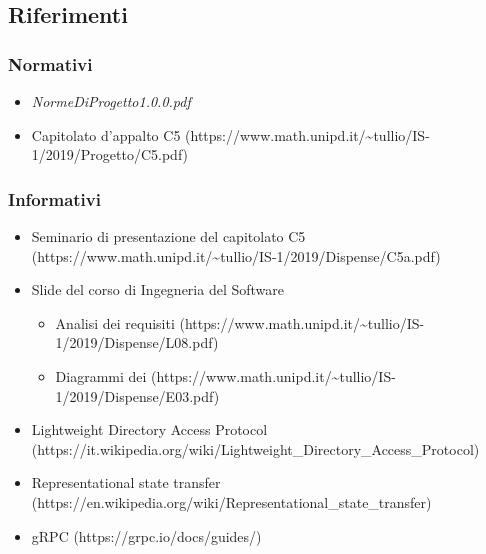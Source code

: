 \documentclass[../analisi-dei-requisiti]{subfiles}
\begin{document}
\subsection{Riferimenti}%
\label{sub:riferimenti}
\subsubsection{Normativi}%
\label{par:normativi}
\begin{itemize}
  \item \textit{NormeDiProgetto1.0.0.pdf}
  \item Capitolato d'appalto C5 (https://www.math.unipd.it/\textasciitilde tullio/IS-1/2019/Progetto/C5.pdf)
\end{itemize}
\subsubsection{Informativi}%
\label{par:informativi}
\begin{itemize}
  \item Seminario di presentazione del capitolato C5 (https://www.math.unipd.it/\textasciitilde tullio/IS-1/2019/Dispense/C5a.pdf)
  \item Slide del corso di Ingegneria del Software
        \begin{itemize}
          \item Analisi dei requisiti (https://www.math.unipd.it/\textasciitilde tullio/IS-1/2019/Dispense/L08.pdf)
          \item Diagrammi dei  (https://www.math.unipd.it/\textasciitilde tullio/IS-1/2019/Dispense/E03.pdf)
        \end{itemize}
  \item Lightweight Directory Access Protocol (https://it.wikipedia.org/wiki/Lightweight\_Directory\_Access\_Protocol)
  \item Representational state transfer (https://en.wikipedia.org/wiki/Representational\_state\_transfer)
  \item gRPC (https://grpc.io/docs/guides/)
\end{itemize}
\end{document}
